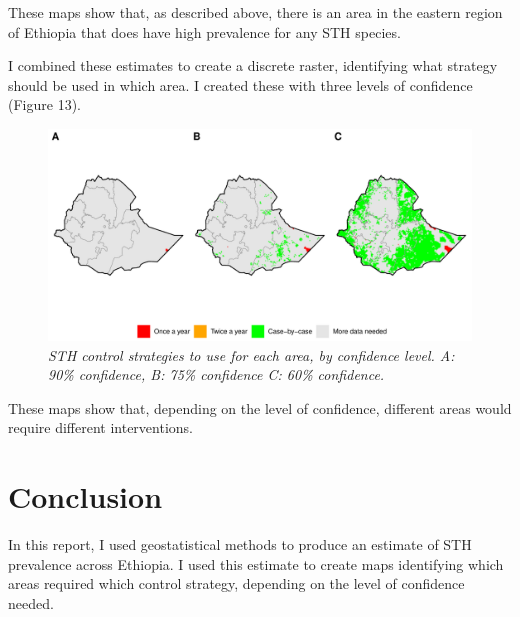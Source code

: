 \documentclass[
]{article}
\begin{document}
These maps show that, as described above, there is an area in the
eastern region of Ethiopia that does have high prevalence for any STH
species.

I combined these estimates to create a discrete raster, identifying what
strategy should be used in which area. I created these with three levels
of confidence (Figure 13).

\begin{figure}
\centering
\includegraphics{write_up_files/figure-latex/discrete.rasters-1.pdf}
\caption{\emph{STH control strategies to use for each area, by
confidence level. A: 90\% confidence, B: 75\% confidence C: 60\%
confidence.}}
\end{figure}

These maps show that, depending on the level of confidence, different
areas would require different interventions.

\newpage

\hypertarget{conclusion}{%
\section{Conclusion}\label{conclusion}}

In this report, I used geostatistical methods to produce an estimate of
STH prevalence across Ethiopia. I used this estimate to create maps
identifying which areas required which control strategy, depending on
the level of confidence needed.
\end{document}
